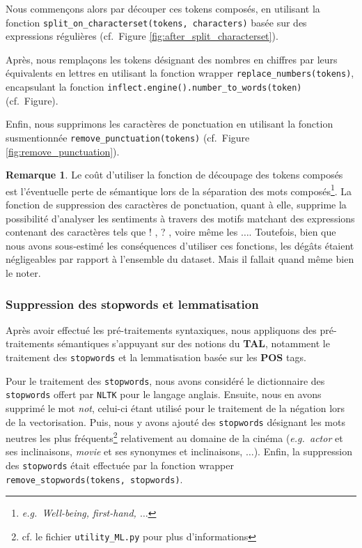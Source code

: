 \documentclass[12pt,a4paper]{report}
\theoremstyle{definition}
\newtheorem*{remark}{Remarque}
\begin{document}
Nous commençons alors par découper ces tokens composés, en utilisant la fonction \texttt{split\_on\_characterset(tokens, characters)} basée sur des expressions régulières (cf.~Figure \ref{fig:after_split_characterset}).

Après, nous remplaçons les tokens désignant des nombres en chiffres par leurs équivalents en lettres en utilisant la fonction wrapper \texttt{replace\_numbers(tokens)}, encapsulant la fonction \texttt{inflect.engine().number\_to\_words(token)} (cf.~Figure).

Enfin, nous supprimons les caractères de ponctuation en utilisant la fonction susmentionnée \texttt{remove\_punctuation(tokens)} (cf.~Figure \ref{fig:remove_punctuation}).

\begin{remark}
  Le coût d'utiliser la fonction de découpage des tokens composés est l'éventuelle perte de sémantique lors de la séparation des mots composés\footnote{\emph{e.g.~Well-being, first-hand, $\dots$}}. La fonction de suppression des caractères de ponctuation, quant à elle, supprime la possibilité d'analyser les sentiments à travers des motifs matchant des expressions contenant des caractères tels que \og ! \fg, \og ? \fg, voire même les $\dots$. Toutefois, bien que nous avons sous-estimé les conséquences d'utiliser ces fonctions, les dégâts étaient négligeables par rapport à l'ensemble du dataset. Mais il fallait quand même bien le noter.
\end{remark}

\subsubsection{Suppression des stopwords et lemmatisation}
Après avoir effectué les pré-traitements syntaxiques, nous appliquons des pré-traitements sémantiques s'appuyant sur des notions du \textbf{TAL}, notamment le traitement des \texttt{stopwords} et la lemmatisation basée sur les \textbf{POS} tags.

Pour le traitement des \texttt{stopwords}, nous avons considéré le dictionnaire des \texttt{stopwords} offert par \texttt{NLTK} pour le langage anglais. Ensuite, nous en avons supprimé le mot \og \textit{not}, celui-ci étant utilisé pour le traitement de la négation lors de la vectorisation. Puis, nous y avons ajouté des \texttt{stopwords} désignant les mots neutres les plus fréquents\footnote{cf. le fichier \texttt{utility\_ML.py} pour plus d'informations} relativement au domaine de la cinéma (\emph{e.g.~actor} et ses inclinaisons, \emph{movie} et ses synonymes et inclinaisons, $\dots$). Enfin, la suppression des \texttt{stopwords} était effectuée par la fonction wrapper \texttt{remove\_stopwords(tokens, stopwords)}.
\end{document}
